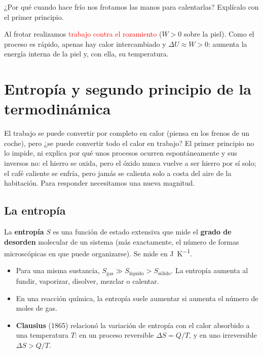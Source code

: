 \begin{exercise}
    ¿Por qué cuando hace frío nos frotamos las manos para calentarlas? Explícalo con el primer principio.
    \begin{solu}
        Al frotar realizamos \textcolor{red}{trabajo contra el rozamiento} (\(W > 0\) sobre la piel). Como el proceso es rápido,
        apenas hay calor intercambiado y \(\Delta U \approx W > 0\): aumenta la energía interna de la piel y, con ella, su
        temperatura.
    \end{solu}
\end{exercise}

\section{Entropía y segundo principio de la termodinámica}\label{sec:ud13-segundo-principio}

El trabajo se puede convertir por completo en calor (piensa en los frenos de un coche), pero ¿se puede convertir todo el calor en
trabajo? El primer principio no lo impide, ni explica por qué unos procesos ocurren espontáneamente y sus inversos no: el hierro se
oxida, pero el óxido nunca vuelve a ser hierro por sí solo; el café caliente se enfría, pero jamás se calienta solo a costa del
aire de la habitación. Para responder necesitamos una nueva magnitud.

\subsection{La entropía}

\begin{definition}[Entropía]
    La \textbf{entropía} \(S\) es una función de estado extensiva que mide el \textbf{grado de desorden} molecular de un sistema
    (más exactamente, el número de formas microscópicas en que puede organizarse). Se mide en \unit{\joule\per\kelvin}.
\end{definition}

\begin{itemize}
    \item Para una misma sustancia, \(S_{\text{gas}} \gg S_{\text{líquido}} > S_{\text{sólido}}\). La entropía aumenta al fundir,
    vaporizar, disolver, mezclar o calentar.
    \item En una reacción química, la entropía suele aumentar si aumenta el número de moles de gas.
    \item \textbf{Clausius} (1865) relacionó la variación de entropía con el calor absorbido a una temperatura \(T\): en un proceso
    reversible \(\Delta S = Q/T\), y en uno irreversible \(\Delta S > Q/T\).
\end{itemize}

